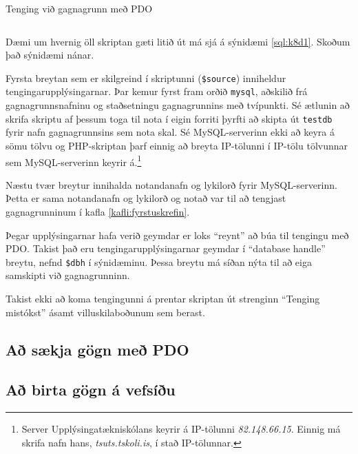 \begin{example}[h]
\caption{Tenging við gagnagrunn með PDO}
\label{sql:k8d1}
\centering
\inputminted[frame=lines, fontfamily=courier]{php}{php/k8d1.php}
\end{example}

Dæmi um hvernig öll skriptan gæti litið út má sjá á sýnidæmi \ref{sql:k8d1}. Skoðum það sýnidæmi nánar. 

Fyrsta breytan sem er skilgreind í skriptunni (\verb|$source|) inniheldur tengingarupplýsingarnar. Þar kemur fyrst fram orðið \verb|mysql|, aðskilið frá gagnagrunnsnafninu og staðsetningu gagnagrunnins með tvípunkti. Sé ætlunin að skrifa skriptu af þessum toga til nota í eigin forriti þyrfti að skipta út \verb|testdb| fyrir nafn gagnagrunnsins sem nota skal. Sé MySQL-serverinn ekki að keyra á sömu tölvu og PHP-skriptan þarf einnig að breyta IP-tölunni í IP-tölu tölvunnar sem MySQL-serverinn keyrir á.\footnote{Server Upplýsingatækniskólans keyrir á IP-tölunni \emph{82.148.66.15}. Einnig má skrifa nafn hans, \emph{tsuts.tskoli.is}, í stað IP-tölunnar.}

Næstu tvær breytur innihalda notandanafn og lykilorð fyrir MySQL-serverinn. Þetta er sama notandanafn og lykilorð og notað var til að tengjast gagnagrunninum í kafla \ref{kafli:fyrstuskrefin}.

Þegar upplýsingarnar hafa verið geymdar er loks ``reynt'' að búa til tengingu með PDO. Takist það eru tengingarupplýsingarnar geymdar í  ``database handle'' breytu, nefnd \verb|$dbh| í sýnidæminu. Þessa breytu má síðan nýta til að eiga samskipti við gagnagrunninn.

Takist ekki að koma tengingunni á prentar skriptan út strenginn ``Tenging mistókst'' ásamt villuskilaboðunum sem berast.
\subsection{Að sækja gögn með PDO}
\subsection{Að birta gögn á vefsíðu}